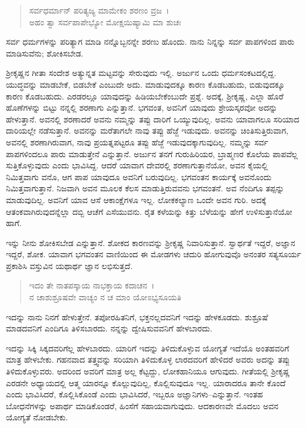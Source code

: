 \begin{verse}
ಸರ್ವಧರ್ಮಾನ್ ಪರಿತ್ಯಜ್ಯ ಮಾಮೇಕಂ ಶರಣಂ ವ್ರಜ~।\\ಅಹಂ ತ್ವಾ ಸರ್ವಪಾಪೇಭ್ಯೋ ಮೋಕ್ಷಯಿಷ್ಯಾಮಿ ಮಾ ಶುಚಃ 
\end{verse}

{\small ಸರ್ವ ಧರ್ಮಗಳನ್ನು ಪರಿತ್ಯಾಗ ಮಾಡಿ ನನ್ನೊಬ್ಬನನ್ನೇ ಶರಣು ಹೊಂದು. ನಾನು ನಿನ್ನನ್ನು ಸರ್ವ ಪಾಪಗಳಿಂದ ಪಾರು ಮಾಡಿಸುವೆನು; ಶೋಕಿಸಬೇಡ.}

ಶ‍್ರೀಕೃಷ್ಣನ ಗೀತಾ ಸಂದೇಶ ಅತ್ಯುನ್ನತ ಮಟ್ಟವನ್ನು ಸೇರುವುದು ಇಲ್ಲಿ. ಅರ್ಜುನ ಒಂದು ಧರ್ಮಸಂಕಟದಲ್ಲಿದ್ದ. ಯುದ್ಧವನ್ನು ಮಾಡಬೇಕೆ, ಬಿಡಬೇಕೆ ಎಂಬುದೇ ಅದು. ಮಾಡುವುದಕ್ಕೂ ಕಾರಣ ಕೊಡಬಹುದು, ಬಿಡುವುದಕ್ಕೂ ಕಾರಣ ಕೊಡಬಹುದು. ಎರಡರಲ್ಲೂ ಯಾವುದನ್ನು ಹಿಡಿಯಬೇಕೆಂಬುದೇ ಪ್ರಶ್ನೆ. ಅದಕ್ಕೆ, ಶ‍್ರೀಕೃಷ್ಣ, ಎಲ್ಲಾ ಹೊರೆ ಹೊಣೆಗಳನ್ನು ಬಿಟ್ಟು ನನ್ನಲ್ಲಿ ಶರಣಾಗು ಎನ್ನುತ್ತಾನೆ. ಭಗವಂತ, ಅವನಿಗೆ ಯಾವುದು ಶ್ರೇಯಸ್ಕರವೋ ಅದನ್ನು ಹೇಳುತ್ತಾನೆ. ಅವನಲ್ಲಿ ಶರಣಾದರೆ ಅವನು ನಮ್ಮನ್ನು ತಪ್ಪು ದಾರಿಗೆ ಒಯ್ಯುವುದಿಲ್ಲ. ಅವನು ಯಾವಾಗಲೂ ಸರಿಯಾದ ದಾರಿಯಲ್ಲೇ ನಡೆಸುತ್ತಾನೆ. ಅವನನ್ನು ಮರೆತಾಗಲೇ ನಾವು ತಪ್ಪು ಹೆಜ್ಜೆ ಇಡುವುದು. ಅವನನ್ನು ಚಿಂತಿಸುತ್ತಿರುವಾಗ, ಅವನಲ್ಲಿ ಶರಣಾಗಿರುವಾಗ, ನಾವು ಪ್ರಯತ್ನಪಟ್ಟರೂ ತಪ್ಪು ಹೆಜ್ಜೆ ಇಡುವುದಕ್ಕಾಗುವುದಿಲ್ಲ. ನಮ್ಮನ್ನು ಸರ್ವ ಪಾಪಗಳಿಂದಲೂ ಪಾರು ಮಾಡುತ್ತೇನೆ ಎನ್ನುತ್ತಾನೆ. ಅರ್ಜುನ ತನಗೆ ಗುರುಹಿರಿಯರ, ಬ್ರಾಹ್ಮಣರ ಕೊಲೆಯ ಪಾಪವೆಲ್ಲ ಸುತ್ತಿಕೊಳ್ಳುವುದು ಎಂದು ಭಾವಿಸಿದ್ದ. ಆದರೆ ಯಾವಾಗ ದೇವರಲ್ಲಿ ಶರಣಾಗುತ್ತಾನೆಯೋ, ಅವನ ಕೈಯಲ್ಲಿ ನಿಮಿತ್ತವಾಗು ವನೊ, ಆಗ ಪಾಪ ಯಾವುದೂ ಅವನಿಗೆ ಬರುವುದಿಲ್ಲ. ಭಗವಂತನ ಕಾರ್ಯಕ್ಕೆ ಅವನೊಂದು ನಿಮಿತ್ತವಾಗುತ್ತಾನೆ. ನಿಜವಾಗಿ ಅವನ ಮೂಲಕ ಕೆಲಸ ಮಾಡುತ್ತಿರುವವನು ಭಗವಂತನೆ. ಅವ ನೆಂದಿಗೂ ತಪ್ಪನ್ನು ಮಾಡುವುದಿಲ್ಲ. ಅವನಿಗೆ ಯಾವ ಆಸೆ ಆಕಾಂಕ್ಷೆಗಳೂ ಇಲ್ಲ. ಲೋಕಕಲ್ಯಾಣ ಒಂದೇ ಅವನ ಗುರಿ. ಅದಕ್ಕೆ ಆತಂಕವಾಗಿರುವುದನ್ನೆಲ್ಲಾ ದಬ್ಬಿ ಆಚೆಗೆ ಎಸೆಯುವನು. ರೈತ ಕಳೆಯನ್ನು ಕಿತ್ತು ಬೆಳೆಯನ್ನು ಹೇಗೆ ಉಳಿಸುತ್ತಾನೆಯೋ ಹಾಗೆ.

ಇನ್ನು ನೀನು ಶೋಕಿಸಬೇಡ ಎನ್ನುತ್ತಾನೆ. ಶೋಕದ ಕಾರಣವನ್ನು ಶ‍್ರೀಕೃಷ್ಣ ನಿವಾರಿಸುತ್ತಾನೆ. ಸ್ವಾರ್ಥತೆ ಇದ್ದರೆ, ಅಜ್ಞಾನ ಇದ್ದರೆ, ಶೋಕ. ಯಾವಾಗ ಭಗವಂತನ ವಾಣಿಯಿಂದ ಈ ಮೋಡಗಳು ಚದುರಿ ಹೋಗುವುವೊ ಅನಂತರ ಸತ್ಯಸೂರ್ಯ ಪ್ರಕಾಶಿಸಿ ವಸ್ತುವಿನ ಯಥಾರ್ಥ ಜ್ಞಾನ ಲಭಿಸುತ್ತದೆ.

\begin{verse}
ಇದಂ ತೇ ನಾತಪಸ್ಕಾಯ ನಾಭಕ್ತಾಯ ಕದಾಚನ~।\\ನ ಚಾಶುಶ್ರೂಷವೇ ವಾಚ್ಯಂ ನ ಚ ಮಾಂ ಯೋಽಭ್ಯಸೂಯತಿ 
\end{verse}

{\small ಇದನ್ನು ನಾನು ನಿನಗೆ ಹೇಳುತ್ತೇನೆ. ತಪೋರಹಿತನಿಗೆ, ಭಕ್ತನಲ್ಲದವನಿಗೆ ಇದನ್ನು ಹೇಳಕೂಡದು. ಶುಶ್ರೂಷೆ ಮಾಡದವನಿಗೆ ಎಂದಿಗೂ ತಿಳಿಸಬಾರದು. ನನ್ನನ್ನು ದ್ವೇಷಿಸುವವನಿಗೆ ಹೇಳಬಾರದು.}

ಇದನ್ನು ಸಿಕ್ಕಿ ಸಿಕ್ಕದವರಿಗೆಲ್ಲ ಹೇಳಬಾರದು. ಯಾರಿಗೆ ಇದನ್ನು ತಿಳಿದುಕೊಳ್ಳುವ ಯೋಗ್ಯತೆ ಇದೆಯೊ ಅಂತಹವರಿಗೆ ಮಾತ್ರ ಹೇಳಬೇಕು. ಗಹನವಾದ ತತ್ತ್ವವನ್ನು ಸರಿಯಾಗಿ ತಿಳಿದುಕೊಳ್ಳ ಲಾರದವರಿಗೆ ಹೇಳಿದರೆ ಅವರು ಅದನ್ನು ತಪ್ಪು ತಿಳಿದುಕೊಳ್ಳುವರು. ಅದರಿಂದ ಅವರಿಗೆ ಮಾತ್ರ ಅಲ್ಲ ಕೆಟ್ಟದ್ದು, ಲೋಕಹಾನಿಯೂ ಆಗುವುದು. ಗೀತೆಯಲ್ಲಿ ಶ‍್ರೀಕೃಷ್ಣ ಎರಡನೇ ಅಧ್ಯಾಯದಲ್ಲಿ ಆತ್ಮ ಯಾರನ್ನೂ ಕೊಲ್ಲುವುದಿಲ್ಲ, ಕೊಲ್ಲಿಸುವುದೂ ಇಲ್ಲ. ಯಾರಾದರೂ ತಾನೇ ಕೊಂದೆ ಎಂದು ಭಾವಿಸಿದರೆ, ಕೊಲ್ಲಿಸಿಕೊಂಡೆ ಎಂದು ಭಾವಿಸಿದರೆ, ಇಬ್ಬರೂ ಅಜ್ಞಾನಿಗಳು–ಎನ್ನುತ್ತಾನೆ. ಇಂತಹ ಬೋಧನೆಗಳನ್ನು ಅಪಾರ್ಥ ಮಾಡಿಕೊಂಡರೆ, ಹಿಂಸೆಗೆ ಸಹಾಯವಾಗುವುದು. ಆದಕಾರಣವೇ ಮೊದಲು ಅವನ ಯೋಗ್ಯತೆ ನೋಡಬೇಕು.

